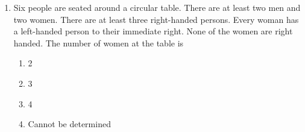 \documentclass[journal,12pt,onecolumn]{IEEEtran}
\theoremstyle{remark}
\begin{document}
\begin{enumerate}
    \item Six people are seated around a circular table. There are at least two men and two women. There
        are at least three right-handed persons. Every woman has a left-handed person to their immediate right.
        None of the women are right handed. The number of women at the table is 
        \hfill{}
        \begin{multicols}{4}
            \begin{enumerate}
                \item  2
                    \columnbreak
                \item 3
                    \columnbreak
                \item 4
                    \columnbreak
                \item Cannot be determined
            \end{enumerate}
        \end{multicols}


\end{enumerate}
\end{document}

